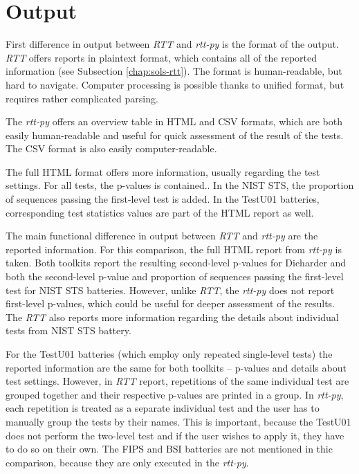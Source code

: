 \documentclass[
  digital,     %
  oneside,     %
  nosansbold,  %
  nocolorbold, %
  nolof,         %
  nolot,         %
]{fithesis4}
\begin{document}
\section{Output}
First difference in output between \emph{RTT} and \emph{rtt-py} is the format of the output. \emph{RTT} offers reports in plaintext format, which contains all of the reported information (see Subsection \ref{chap:sols-rtt}). The format is human-readable, but hard to navigate. Computer processing is possible thanks to unified format, but requires rather complicated parsing.

The \emph{rtt-py} offers an overview table in HTML and CSV formats, which are both easily human-readable and useful for quick assessment of the result of the tests. The CSV format is also easily computer-readable. 

The full HTML format offers more information, usually regarding the test settings. For all tests, the p-values is contained.. In the NIST STS, the proportion of sequences passing the first-level test is added. In the TestU01 batteries, corresponding test statistics values are part of the HTML report as well.

The main functional difference in output between \emph{RTT} and \emph{rtt-py} are the reported information. For this comparison, the full HTML report from \emph{rtt-py} is taken. Both toolkits report the resulting second-level p-values for Dieharder and both the second-level p-value and proportion of sequences passing the first-level test for NIST STS batteries. However, unlike \emph{RTT}, the \emph{rtt-py} does not report first-level p-values, which could be useful for deeper assessment of the results. The \emph{RTT} also reports more information regarding the details about individual tests from NIST STS battery.

For the TestU01 batteries (which employ only repeated single-level tests) the reported information are the same for both toolkits -- p-values and details about test settings. However, in \emph{RTT} report, repetitions of the same individual test are grouped together and their respective p-values are printed in a group. In \emph{rtt-py}, each repetition is treated as a separate individual test and the user has to manually group the tests by their names. This is important, because the TestU01 does not perform the two-level test and if the user wishes to apply it, they have to do so on their own. The FIPS and BSI batteries are not mentioned in thic comparison, because they are only executed in the \emph{rtt-py}.
\end{document}

